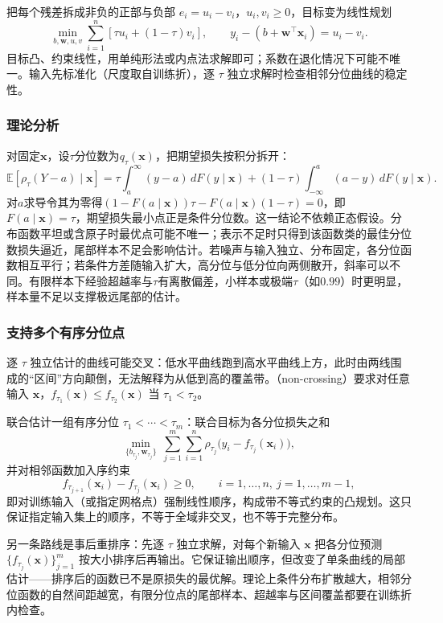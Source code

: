 把每个残差拆成非负的正部与负部 $e_i=u_i-v_i$，$u_i,v_i\geq0$，目标变为线性规划
\begin{equation}
  \min_{b,\bm{w},u,v}
  \sum_{i=1}^n[\tau u_i+(1-\tau)v_i],
  \qquad
  y_i-(b+\bm{w}^{\top}\bm{x}_i)=u_i-v_i.
  \label{eq:regression-quantile-lp}
\end{equation}
目标凸、约束线性，用单纯形法或内点法求解即可；系数在退化情况下可能不唯一。输入先标准化（尺度取自训练折），逐 $\tau$ 独立求解时检查相邻分位曲线的稳定性。

\subsubsection{理论分析}
\label{sec:regression-quantile-theory}

对固定$\bm{x}$，设$\tau$分位数为$q_\tau(\bm{x})$，把期望损失按积分拆开：
\[
  \mathbb E[\rho_\tau(Y-a)\mid\bm{x}]
  =\tau\int_a^\infty(y-a)\,dF(y\mid\bm{x})
  +(1-\tau)\int_{-\infty}^a(a-y)\,dF(y\mid\bm{x}).
\]
对$a$求导令其为零得$(1-F(a\mid\bm{x}))\tau-F(a\mid\bm{x})(1-\tau)=0$，即$F(a\mid\bm{x})=\tau$，期望损失最小点正是条件分位数。这一结论不依赖正态假设。分布函数平坦或含原子时最优点可能不唯一；表示不足时只得到该函数类的最佳分位数损失逼近，尾部样本不足会影响估计。若噪声与输入独立、分布固定，各分位函数相互平行；若条件方差随输入扩大，高分位与低分位向两侧散开，斜率可以不同。有限样本下经验超越率与$\tau$有离散偏差，小样本或极端$\tau$（如$0.99$）时更明显，样本量不足以支撑极远尾部的估计。

\subsubsection{支持多个有序分位点}
\label{sec:regression-quantile-ordering}

逐 $\tau$ 独立估计的曲线可能交叉：低水平曲线跑到高水平曲线上方，此时由两线围成的“区间”方向颠倒，无法解释为从低到高的覆盖带。（non-crossing）要求对任意输入 $\bm{x}$，$f_{\tau_1}(\bm{x})\leq f_{\tau_2}(\bm{x})$ 当 $\tau_1<\tau_2$。

联合估计一组有序分位 $\tau_1<\cdots<\tau_m$：联合目标为各分位损失之和
\[
  \min_{\{b_{\tau_j},\bm w_{\tau_j}\}}\ \sum_{j=1}^{m}\sum_{i=1}^{n}\rho_{\tau_j}\bigl(y_i-f_{\tau_j}(\bm{x}_i)\bigr),
\]
并对相邻函数加入序约束
\[
  f_{\tau_{j+1}}(\bm{x}_i)-f_{\tau_j}(\bm{x}_i)\geq0,\qquad i=1,\ldots,n,\ j=1,\ldots,m-1,
\]
即对训练输入（或指定网格点）强制线性顺序，构成带不等式约束的凸规划。这只保证指定输入集上的顺序，不等于全域非交叉，也不等于完整分布。

另一条路线是事后重排序：先逐 $\tau$ 独立求解，对每个新输入 $\bm{x}$ 把各分位预测 $\{f_{\tau_j}(\bm{x})\}_{j=1}^{m}$ 按大小排序后再输出。它保证输出顺序，但改变了单条曲线的局部估计——排序后的函数已不是原损失的最优解。理论上条件分布扩散越大，相邻分位函数的自然间距越宽，有限分位点的尾部样本、超越率与区间覆盖都要在训练折内检查。
